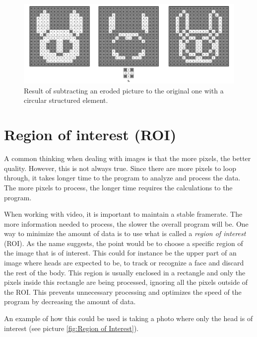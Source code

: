 {%
\begin{figure}[htbp]
\centering
\includegraphics[width=1\textwidth]{Pictures/Theory/BoundaryEdges_circ.png}
\caption{Result of subtracting an eroded picture to the original one with a circular structured element.}
\label{fig:Boundary}
\end{figure}

\section{Region of interest (ROI)}
A common thinking when dealing with images is that the more pixels, the better quality. However, this is not always true. Since there are more pixels to loop through, it takes longer time to the program to analyze and process the data. The more pixels to process, the longer time requires the calculations to the program.

When working with video, it is important to maintain a stable framerate. The more information needed to process, the slower the overall program will be. One way to minimize the amount of data is to use what is called a \textit{region of interest} (ROI). As the name suggests, the point would be to choose a specific region of the image that is of interest. This could for instance be the upper part of an image where heads are expected to be, to track or recognize a face and discard the rest of the body. This region is usually enclosed in a rectangle and only the pixels inside this rectangle are being processed, ignoring all the pixels outside of the ROI. This prevents unnecessary processing and optimizes the speed of the program by decreasing the amount of data.

An example of how this could be used is taking a photo where only the head is of interest (see picture \ref{fig:Region of Interest}).

}
